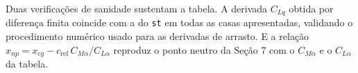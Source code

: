 Duas verificações de sanidade sustentam a tabela. A derivada $C_{Lq}$
obtida por diferença finita coincide com a do \texttt{st} em todas as
casas apresentadas, validando o procedimento numérico usado para as
derivadas de arrasto. E a relação $x_{np} = x_{cg} -
c_{\mathrm{ref}}\,C_{M\alpha}/C_{L\alpha}$ reproduz o ponto neutro da
Seção 7 com o $C_{M\alpha}$ e o $C_{L\alpha}$ da tabela.
